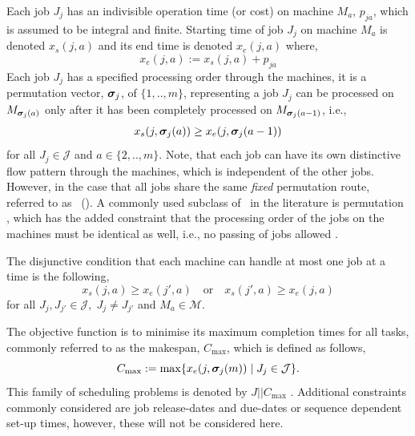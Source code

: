 \documentclass[smallextended]{svjour3}
\begin{document}
Each job $J_j$ has an indivisible operation time (or cost) on machine $M_a$, 
$p_{ja}$, which is assumed to be integral and finite. 
Starting time of job $J_j$ on machine $M_a$ is denoted $x_s(j,a)$ and its 
end time is denoted $x_e(j,a)$ where, 
\begin{equation}  x_e(j,a):=x_s(j,a)+p_{ja} \end{equation} 
Each job $J_j$ has a specified processing order through the machines, it is a 
permutation vector, $\bm \sigma_j$, of $\{1,..,m\}$, representing a job $J_j$ can 
be processed on $M_{\bm \sigma_j(a)}$ only after it has been completely processed 
on $M_{\bm \sigma_j(a-1)}$, i.e.,
\begin{equation}\label{eq:permutation}
x_s(j,\bm \sigma_j(a)) \geq x_e(j,\bm \sigma_j(a-1)) 
\end{equation}
for all $J_j\in\mathcal{J}$ and $a\in\{2,..,m\}$. 
Note, that each job can have its own distinctive flow pattern through the 
machines, which is independent of the other jobs. 
However, in the case that all jobs share the same \emph{fixed} permutation 
route, referred to as \fsp~(\FSP). 
A commonly used subclass of \FSP\ in the literature is permutation \fsp, which 
has the added constraint that the processing order of the jobs on the machines 
must be identical as well, i.e., no passing of jobs allowed \cite{Stafford88}.

The disjunctive condition that each machine can handle at most one job at a 
time is the following,
\begin{equation}\label{eq:oneJobPerMac}
x_s(j,a) \geq x_e(j',a) \quad\textrm{or}\quad x_s(j',a) \geq x_e(j,a)  
\end{equation}
for all $J_j,J_{j'}\in\mathcal{J},\; J_j\neq J_{j'}$ and $M_a\in\mathcal{M}$. 

The objective function is to minimise its maximum completion times for all 
tasks, commonly referred to as the makespan, $C_{\max}$, which is defined as 
follows,
\begin{equation}
C_{\max} := 
\max\{x_e(j,\bm \sigma_j(m))\;|\;J_j\in\mathcal{J}\}.\label{eq:makespan}
\end{equation} 
This family of scheduling problems is denoted by $J||C_{\max}$ 
\cite{Pinedo08}.
Additional constraints commonly considered are job release-dates and due-dates 
or sequence dependent set-up times, however, these will not be considered here. 
  
\end{document}
